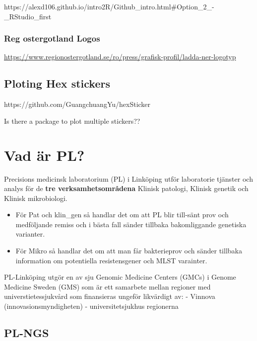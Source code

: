 \documentclass[
  letterpaper,
  DIV=11,
  numbers=noendperiod]{scrreprt}
\begin{document}

https://alexd106.github.io/intro2R/Github\_intro.html\#Option\_2\_-\_RStudio\_first

\subsection*{Reg ostergotland Logos}\label{reg-ostergotland-logos}

\url{https://www.regionostergotland.se/ro/press/grafisk-profil/ladda-ner-logotyp}

\section*{Ploting Hex stickers}\label{ploting-hex-stickers}


https://github.com/GuangchuangYu/hexSticker

Is there a package to plot multiple stickers??


\chapter{Vad är PL?}\label{vad-uxe4r-pl}

Precisions medicinsk laboratorium (PL) i Linköping utför laboratorie
tjänster och analys för de \textbf{tre verksamhetsområdena} Klinisk
patologi, Klinisk genetik och Klinisk mikrobiologi.

\begin{itemize}
\item
  För Pat och klin\_gen så handlar det om att PL blir till-sänt prov och
  medföljande remiss och i bästa fall sänder tillbaka bakomliggande
  genetiska varianter.
\item
  För Mikro så handlar det om att man får bakterieprov och sänder
  tillbaka information om potentiella resistensgener och MLST varainter.
\end{itemize}

PL-Linköping utgör en av sju Genomic Medicine Centers (GMCs) i Genome
Medicine Sweden (GMS) som är ett samarbete mellan regioner med
universtietessjukvård som finansieras ungeför likvärdigt av: - Vinnova
(innovasionsmyndigheten) - universitetsjukhus regionerna

\section{PL-NGS}\label{pl-ngs}
\end{document}
